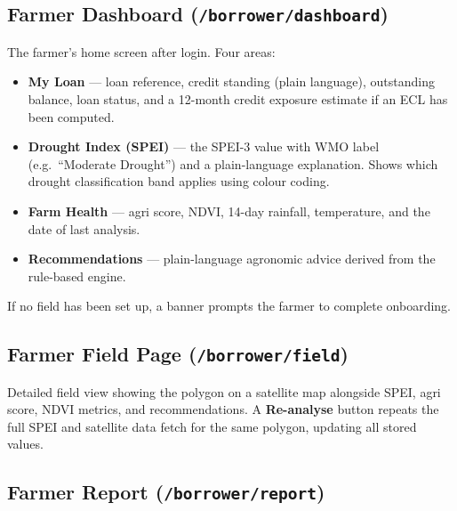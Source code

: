 \documentclass[12pt,a4paper]{article}
\begin{document}
\subsection{Farmer Dashboard (\texttt{/borrower/dashboard})}

The farmer's home screen after login.  Four areas:

\begin{itemize}[leftmargin=1.5em]
  \item \textbf{My Loan} --- loan reference, credit standing (plain language),
        outstanding balance, loan status, and a 12-month credit exposure
        estimate if an ECL has been computed.
  \item \textbf{Drought Index (SPEI)} --- the SPEI-3 value with WMO label
        (e.g.\ ``Moderate Drought'') and a plain-language explanation.
        Shows which drought classification band applies using colour coding.
  \item \textbf{Farm Health} --- agri score, NDVI, 14-day rainfall,
        temperature, and the date of last analysis.
  \item \textbf{Recommendations} --- plain-language agronomic advice derived
        from the rule-based engine.
\end{itemize}

If no field has been set up, a banner prompts the farmer to complete onboarding.

\subsection{Farmer Field Page (\texttt{/borrower/field})}

Detailed field view showing the polygon on a satellite map alongside SPEI,
agri score, NDVI metrics, and recommendations.  A \textbf{Re-analyse} button
repeats the full SPEI and satellite data fetch for the same polygon, updating
all stored values.

\subsection{Farmer Report (\texttt{/borrower/report})}
\end{document}
